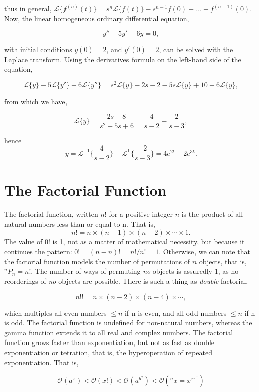 \documentclass[11pt]{amsart}
\begin{document}
thus in general, $\mathcal{L}\{f^{(n)}(t)\} = s^n \mathcal{L}\{f(t)\} - s^{n-1}f(0) - \dots - f^{(n-1)}(0)$. Now, the linear homogeneous ordinary differential equation,

$$y'' - 5y' + 6y = 0,$$

with initial conditions $y(0) = 2$, and $y'(0) = 2$, can be solved with the Laplace transform. Using the derivatives formula on the left-hand side of the equation,

$$\mathcal{L}\{y\} - 5\mathcal{L}\{y'\} + 6\mathcal{L}\{y''\} = s^2\mathcal{L}\{y\} - 2s - 2 - 5s\mathcal{L}\{y\} +10 + 6\mathcal{L}\{y\},$$

from which we have,

$$\mathcal{L}\{y\} = \frac{2s - 8}{s^2 - 5s + 6} = \frac{4}{s - 2} - \frac{2}{s - 3},$$

hence $$y = \mathcal{L}^{-1}\bigg\{\frac{4}{s - 2}\bigg\} - \mathcal{L}^{1}\bigg\{\frac{-2}{s - 3}\bigg\} = 4e^{2t} - 2e^{3t}.$$

\section{The Factorial Function}

The factorial function, written $n!$ for a positive integer $n$ is the product of all natural numbers less than or equal to n. That is, $$n! = n \times (n - 1) \times (n - 2) \times \cdots \times 1.$$ The value of $0!$ is 1, not as a matter of mathematical necessity, but because it continues the pattern: $0! = (n - n)! = n!/n! = 1$. Otherwise, we can note that the factorial function models the number of permutations of $n$ objects, that is, $^nP_n = n!$. The number of ways of permuting \emph{no} objects is assuredly 1, as no reorderings of \emph{no} objects are possible. There is such a thing as \emph{double} factorial,

$$n!! = n \times (n - 2) \times (n - 4) \times \cdots,$$

which multiples all even numbers $\leq n$ if n is even, and all odd numbers $\leq n$ if n is odd.  The factorial function is undefined for non-natural numbers, whereas the gamma function extends it to all real and complex numbers. The factorial function grows faster than exponentiation, but not as fast as double exponentiation or tetration, that is, the hyperoperation of repeated exponentiation. That is,

$$\mathcal{O}(a^x) < \mathcal{O}(x!) < \mathcal{O}(a^{b^x}) < \mathcal{O}(^nx = x^{x^{\iddots^{x}}})$$
\end{document}
